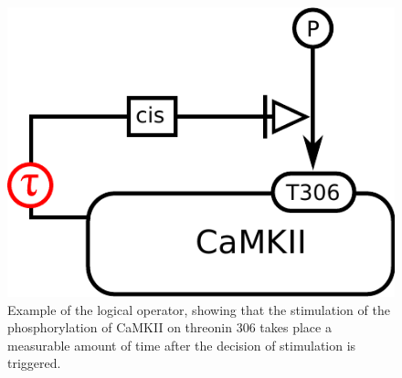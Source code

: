 \begin{figure}[H]
  \centering
  \includegraphics[scale = 0.5]{examples/ex-delay}
  \caption{Example of the  logical operator, showing that the stimulation of the phosphorylation of CaMKII on threonin 306 takes place a measurable amount of time after the decision of stimulation is triggered.}
  \label{fig:ex-delay}
\end{figure}

